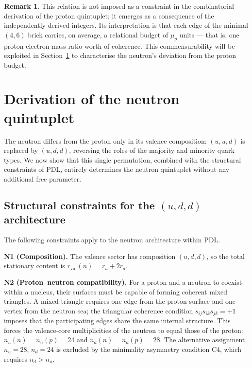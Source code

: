\documentclass[11pt,a4paper]{article}
\theoremstyle{definition}
\newtheorem{remark}[theorem]{Remark}
\newcommand{\PDL}{\textnormal{PDL}}
\newcommand{\rval}{r_{\mathrm{val}}}
\begin{document}
\begin{remark}
This relation is not imposed as a constraint in the combinatorial derivation of the proton quintuplet; it emerges as a consequence of the independently derived integers. Its interpretation is that each edge of the minimal $(4,6)$ brick carries, on average, a relational budget of $\mu_p$ units --- that is, one proton-electron mass ratio worth of coherence. This commensurability will be exploited in Section~\ref{sec:neutron} to characterise the neutron's deviation from the proton budget.
\end{remark}

\section{Derivation of the neutron quintuplet}
\label{sec:neutron}

The neutron differs from the proton only in its valence composition: $(u,u,d)$ is replaced by $(u,d,d)$, reversing the roles of the majority and minority quark types. We now show that this single permutation, combined with the structural constraints of \PDL, entirely determines the neutron quintuplet without any additional free parameter.

\subsection{Structural constraints for the \texorpdfstring{$(u,d,d)$}{(u,d,d)} architecture}
\label{subsec:neutron_constraints}

The following constraints apply to the neutron architecture within \PDL.

\medskip\noindent\textbf{N1 (Composition).} The valence sector has composition $(u,d,d)$, so the total stationary content is $\rval(n) = r_u + 2r_d$.

\medskip\noindent\textbf{N2 (Proton--neutron compatibility).} For a proton and a neutron to coexist within a nucleus, their surfaces must be capable of forming coherent mixed triangles. A mixed triangle requires one edge from the proton surface and one vertex from the neutron sea; the triangular coherence condition $s_{ij}s_{ik}s_{jk} = +1$ imposes that the participating edges share the same internal structure. This forces the valence-core multiplicities of the neutron to equal those of the proton: $n_u(n) = n_u(p) = 24$ and $n_d(n) = n_d(p) = 28$. The alternative assignment $n_u = 28$, $n_d = 24$ is excluded by the minimality asymmetry condition C4, which requires $n_d > n_u$.\cite{Combinatorial_Proton_v2_2026}
\end{document}
